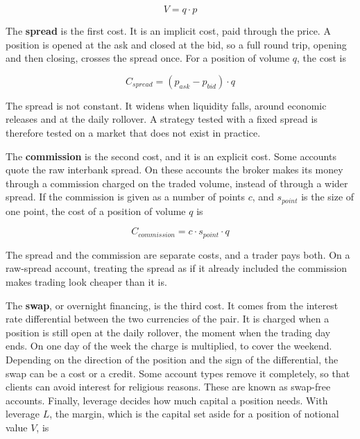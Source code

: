 \begin{equation}
V = q \cdot p
\end{equation}

The \textbf{spread} is the first cost. It is an implicit cost, paid through the price. A position is opened at the ask and closed at the bid, so a full round trip, opening and then closing, crosses the spread once. For a position of volume $q$, the cost is

\begin{equation}
C_{spread} = (p_{ask} - p_{bid}) \cdot q
\label{Equation:SpreadCost}
\end{equation}

The spread is not constant. It widens when liquidity falls, around economic releases and at the daily rollover. A strategy tested with a fixed spread is therefore tested on a market that does not exist in practice.

The \textbf{commission} is the second cost, and it is an explicit cost. Some accounts quote the raw interbank spread. On these accounts the broker makes its money through a commission charged on the traded volume, instead of through a wider spread. If the commission is given as a number of points $c$, and $s_{point}$ is the size of one point, the cost of a position of volume $q$ is

\begin{equation}
C_{commission} = c \cdot s_{point} \cdot q
\label{Equation:CommissionCost}
\end{equation}

The spread and the commission are separate costs, and a trader pays both. On a raw-spread account, treating the spread as if it already included the commission makes trading look cheaper than it is.

The \textbf{swap}, or overnight financing, is the third cost. It comes from the interest rate differential between the two currencies of the pair. It is charged when a position is still open at the daily rollover, the moment when the trading day ends. On one day of the week the charge is multiplied, to cover the weekend. Depending on the direction of the position and the sign of the differential, the swap can be a cost or a credit. Some account types remove it completely, so that clients can avoid interest for religious reasons. These are known as swap-free accounts. Finally, leverage decides how much capital a position needs. With leverage $L$, the margin, which is the capital set aside for a position of notional value $V$, is

